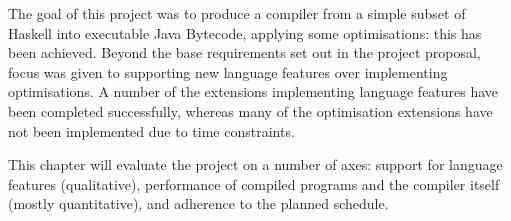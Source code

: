 \documentclass[dissertation.tex]{subfiles}
\begin{document}
The goal of this project was to produce a compiler from a simple subset of Haskell into executable Java Bytecode,
applying some optimisations: this has been achieved. Beyond the base requirements set out in the project proposal, focus
was given to supporting new language features over implementing optimisations. A number of the extensions implementing
language features have been completed successfully, whereas many of the optimisation extensions have not been
implemented due to time constraints.

This chapter will evaluate the project on a number of axes: support for language features (qualitative), performance of
compiled programs and the compiler itself (mostly quantitative), and adherence to the planned schedule.

\end{document}
